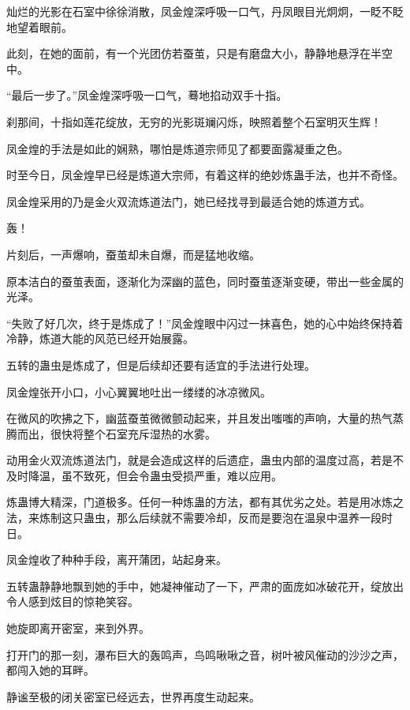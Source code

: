 
\begin{this_body}

灿烂的光影在石室中徐徐消散，凤金煌深呼吸一口气，丹凤眼目光炯炯，一眨不眨地望着眼前。

此刻，在她的面前，有一个光团仿若蚕茧，只是有磨盘大小，静静地悬浮在半空中。

“最后一步了。”凤金煌深呼吸一口气，蓦地掐动双手十指。

刹那间，十指如莲花绽放，无穷的光影斑斓闪烁，映照着整个石室明灭生辉！

凤金煌的手法是如此的娴熟，哪怕是炼道宗师见了都要面露凝重之色。

时至今日，凤金煌早已经是炼道大宗师，有着这样的绝妙炼蛊手法，也并不奇怪。

凤金煌采用的乃是金火双流炼道法门，她已经找寻到最适合她的炼道方式。

轰！

片刻后，一声爆响，蚕茧却未自爆，而是猛地收缩。

原本洁白的蚕茧表面，逐渐化为深幽的蓝色，同时蚕茧逐渐变硬，带出一些金属的光泽。

“失败了好几次，终于是炼成了！”凤金煌眼中闪过一抹喜色，她的心中始终保持着冷静，炼道大能的风范已经开始展露。

五转的蛊虫是炼成了，但是后续却还要有适宜的手法进行处理。

凤金煌张开小口，小心翼翼地吐出一缕缕的冰凉微风。

在微风的吹拂之下，幽蓝蚕茧微微颤动起来，并且发出嗤嗤的声响，大量的热气蒸腾而出，很快将整个石室充斥湿热的水雾。

动用金火双流炼道法门，就是会造成这样的后遗症，蛊虫内部的温度过高，若是不及时降温，虽不致死，但会令蛊虫受损严重，难以应用。

炼蛊博大精深，门道极多。任何一种炼蛊的方法，都有其优劣之处。若是用冰炼之法，来炼制这只蛊虫，那么后续就不需要冷却，反而是要泡在温泉中温养一段时日。

凤金煌收了种种手段，离开蒲团，站起身来。

五转蛊静静地飘到她的手中，她凝神催动了一下，严肃的面庞如冰破花开，绽放出令人感到炫目的惊艳笑容。

她旋即离开密室，来到外界。

打开门的那一刻，瀑布巨大的轰鸣声，鸟鸣啾啾之音，树叶被风催动的沙沙之声，都闯入她的耳畔。

静谧至极的闭关密室已经远去，世界再度生动起来。


\end{this_body}
